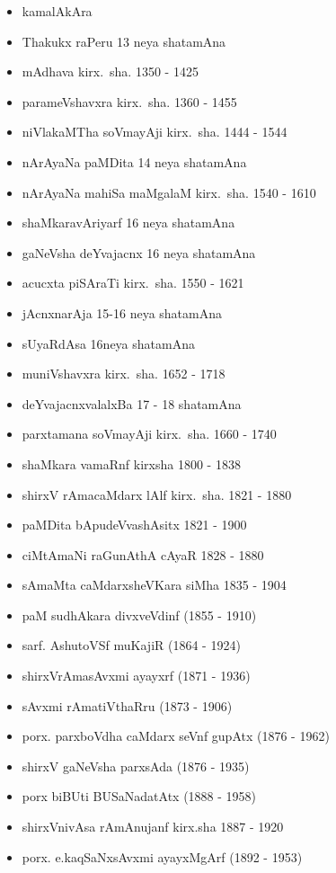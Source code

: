 {\begin{itemize}
\item kamalAkAra
\item Thakukx raPeru {\rm 13} neya shatamAna
\item mAdhava kirx.~sha. {\rm 1350 - 1425}
\item parameVshavxra kirx.~sha. {\rm 1360 - 1455}
\item niVlakaMTha soVmayAji kirx.~sha. {\rm 1444 - 1544}
\item nArAyaNa paMDita {\rm 14} neya shatamAna
\item nArAyaNa mahiSa maMgalaM kirx.~sha. {\rm 1540 - 1610}
\item shaMkaravAriyarf {\rm 16} neya shatamAna
\item gaNeVsha deYvajacnx {\rm 16} neya shatamAna
\item acucxta piSAraTi kirx.~sha. {\rm 1550 - 1621}
\item jAcnxnarAja {\rm 15-16} neya shatamAna
\item sUyaRdAsa {\rm 16}neya shatamAna
\item muniVshavxra kirx.~sha. {\rm 1652 - 1718}
\item deYvajacnxvalalxBa {\rm 17 - 18} shatamAna
\item parxtamana soVmayAji kirx.~sha. {\rm 1660 - 1740}
\item shaMkara vamaRnf kirxsha {\rm 1800 - 1838}
\item shirxV rAmacaMdarx lAlf kirx.~sha. {\rm 1821 - 1880}
\item paMDita bApudeVvashAsitx {\rm 1821 - 1900}
\item ciMtAmaNi raGunAthA cAyaR {\rm 1828 - 1880}
\item sAmaMta caMdarxsheVKara siMha {\rm 1835 - 1904}
\item paM sudhAkara divxveVdinf {\rm (1855 - 1910)}
\item sarf. AshutoVSf muKajiR {\rm (1864 - 1924)}
\item shirxVrAmasAvxmi ayayxrf {\rm (1871 - 1936)}
\item sAvxmi rAmatiVthaRru {\rm (1873 - 1906)}
\item porx. parxboVdha caMdarx seVnf gupAtx {\rm (1876 - 1962)}
\item shirxV gaNeVsha parxsAda {\rm (1876 - 1935)}
\item porx biBUti BUSaNadatAtx {\rm (1888 - 1958)}
\item shirxVnivAsa rAmAnujanf kirx.sha {\rm 1887 - 1920}
\item porx. e.kaqSaNxsAvxmi ayayxMgArf {\rm (1892 - 1953)}

\end{itemize}}

